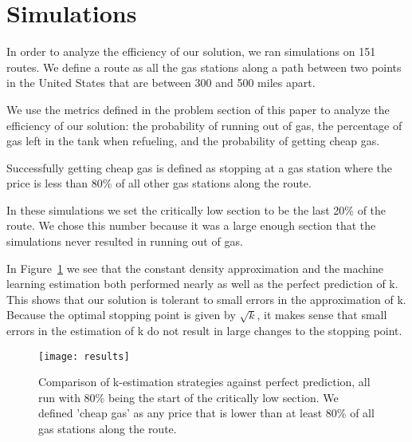 \section{Simulations}
In order to analyze the efficiency of our solution, we ran simulations on 151 routes. We define a route as all the gas stations along a path between two points in the United States that are between 300 and 500 miles apart.

We use the metrics defined in the problem section of this paper to analyze the efficiency of our solution: the probability of running out of gas, the percentage of gas left in the tank when refueling, and the probability of getting cheap gas.

Successfully getting cheap gas is defined as stopping at a gas station where the price is less than 80\% of all other gas stations along the route.

In these simulations we set the critically low section to be the last 20\% of the route. We chose this number because it was a large enough section that the simulations never resulted in running out of gas.

In Figure~\ref{fig:results} we see that the constant density approximation and the machine learning estimation both performed nearly as well as the perfect prediction of k. This shows that our solution is tolerant to small errors in the approximation of k. Because the optimal stopping point is given by $\sqrt{k}$, it makes sense that small errors in the estimation of k do not result in large changes to the stopping point.

\begin{figure}
\label{fig:results}
\centering
\texttt{[image: results]}
\caption{Comparison of k-estimation strategies against perfect prediction, all run with 80\% being the start of the critically low section. We defined 'cheap gas' as any price that is lower than at least 80\% of all gas stations along the route.}
\end{figure}

